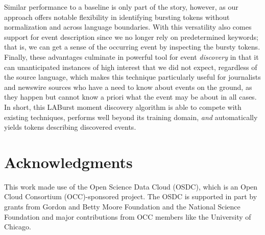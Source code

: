 \documentclass[letterpaper]{article}
\begin{document}
Similar performance to a baseline is only part of the story, however, as our approach offers notable flexibility in identifying bursting tokens without normalization and across language boundaries.
With this versatility also comes support for event description since we no longer rely on predetermined keywords; that is, we can get a sense of the occurring event by inspecting the bursty tokens.
Finally, these advantages culminate in powerful tool for event \emph{discovery} in that it can unanticipated instances of high interest that we did not expect, regardless of the source language, which makes this technique particularly useful for journalists and newswire sources who have a need to know about events on the ground, as they happen but cannot know a priori what the event may be about in all cases.
In short, this LABurst moment discovery algorithm is able to compete with existing techniques, performs well beyond its training domain, \emph{and} automatically yields tokens describing discovered events.


\section{Acknowledgments}
This work made use of the Open Science Data Cloud (OSDC), which is an Open Cloud Consortium (OCC)-sponsored project. 
The OSDC is supported in part by grants from Gordon and Betty Moore Foundation and the National Science Foundation and major contributions from OCC members like the University of Chicago. 

%

\end{document}
